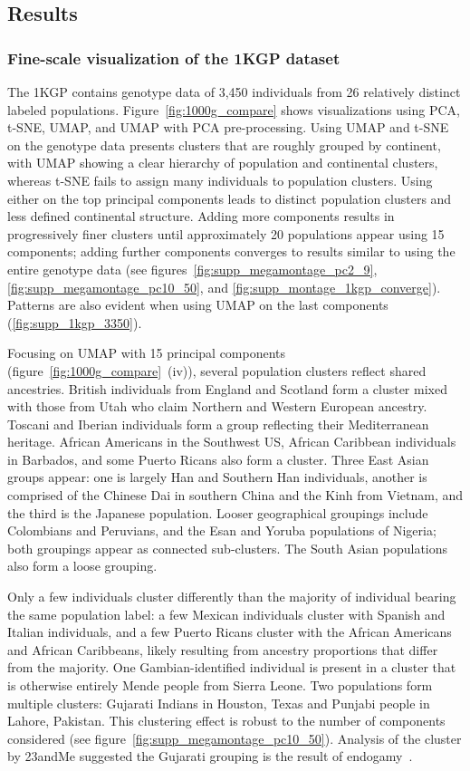 \documentclass[12pt]{pnas-new}
\begin{document}
\subsection*{Results}
\subsubsection*{Fine-scale visualization of the 1KGP dataset} The 1KGP contains genotype data of 3,450 individuals from 26 relatively distinct labeled populations\cite{10002015global}. Figure~\ref{fig:1000g_compare} shows visualizations using PCA, t-SNE, UMAP, and UMAP with PCA pre-processing. Using UMAP and t-SNE on the genotype data presents clusters that are roughly grouped by continent, with UMAP showing a clear hierarchy of population and continental clusters, whereas t-SNE fails to assign many individuals to population clusters. Using either on the top principal components leads to distinct population clusters and less defined continental structure. Adding more components results in progressively finer clusters until approximately 20 populations appear using 15 components; adding further components converges to results similar to using the entire genotype data (see figures~\ref{fig:supp_megamontage_pc2_9}, \ref{fig:supp_megamontage_pc10_50}, and \ref{fig:supp_montage_1kgp_converge}). Patterns are also evident when using UMAP on the last components (\ref{fig:supp_1kgp_3350}).

Focusing on UMAP with 15 principal components (figure~\ref{fig:1000g_compare}~(iv)), several population clusters reflect shared ancestries. British individuals from England and Scotland form a cluster mixed with those from Utah who claim Northern and Western European ancestry. Toscani and Iberian individuals form a group reflecting their Mediterranean heritage. African Americans in the Southwest US, African Caribbean individuals in Barbados, and some Puerto Ricans also form a cluster. Three East Asian groups appear: one is largely Han and Southern Han individuals, another is comprised of the Chinese Dai in southern China and the Kinh from Vietnam, and the third is the Japanese population. Looser geographical groupings include Colombians and Peruvians, and the Esan and Yoruba populations of Nigeria; both groupings appear as connected sub-clusters. The South Asian populations also form a loose grouping. 

Only a few individuals cluster differently than the majority of individual bearing the same population label: a few Mexican individuals cluster with Spanish and Italian individuals, and a few Puerto Ricans cluster with the African Americans and African Caribbeans, likely resulting from ancestry proportions that differ from the majority. One Gambian-identified individual is present in a cluster that is otherwise entirely Mende people from Sierra Leone. Two populations form multiple clusters: Gujarati Indians in Houston, Texas and Punjabi people in Lahore, Pakistan. This clustering effect is robust to the number of components considered (see figure~\ref{fig:supp_megamontage_pc10_50}). Analysis of the cluster by 23andMe suggested the Gujarati grouping is the result of endogamy~\cite{23andme}.
\end{document}
